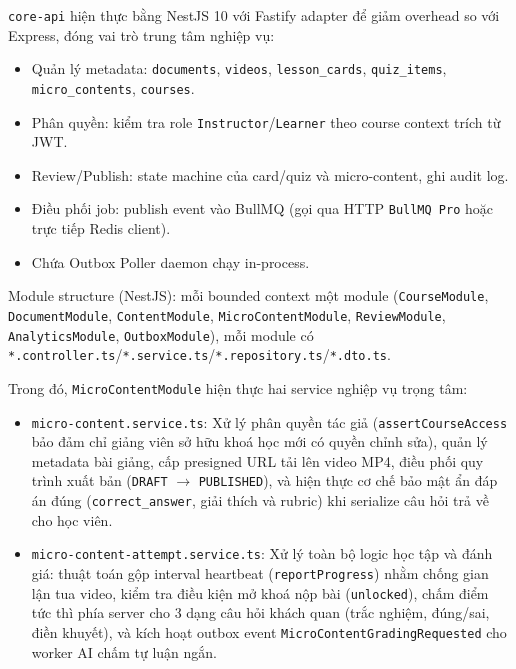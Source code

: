 \texttt{core-api} hiện thực bằng NestJS 10 với Fastify adapter để
giảm overhead so với Express, đóng vai trò trung tâm nghiệp vụ:

\begin{itemize}
    \item Quản lý metadata: \texttt{documents}, \texttt{videos},
          \texttt{lesson\_cards}, \texttt{quiz\_items}, \texttt{micro\_contents}, \texttt{courses}.
    \item Phân quyền: kiểm tra role \texttt{Instructor}/\texttt{Learner}
          theo course context trích từ JWT.
    \item Review/Publish: state machine của card/quiz và micro-content, ghi audit log.
    \item Điều phối job: publish event vào BullMQ (gọi qua HTTP
          \texttt{BullMQ Pro} hoặc trực tiếp Redis client).
    \item Chứa Outbox Poller daemon chạy in-process.
\end{itemize}

Module structure (NestJS): mỗi bounded context một module
(\texttt{CourseModule}, \texttt{DocumentModule}, \texttt{ContentModule},
\texttt{MicroContentModule}, \texttt{ReviewModule}, \texttt{AnalyticsModule}, \texttt{OutboxModule}),
mỗi module có
\texttt{*.controller.ts}/\texttt{*.service.ts}/\texttt{*.repository.ts}/\texttt{*.dto.ts}.

Trong đó, \texttt{MicroContentModule} hiện thực hai service nghiệp vụ trọng tâm:
\begin{itemize}
    \item \texttt{micro-content.service.ts}: Xử lý phân quyền tác giả (\texttt{assertCourseAccess} bảo đảm chỉ giảng viên sở hữu khoá học mới có quyền chỉnh sửa), quản lý metadata bài giảng, cấp presigned URL tải lên video MP4, điều phối quy trình xuất bản (\texttt{DRAFT} $\to$ \texttt{PUBLISHED}), và hiện thực cơ chế bảo mật ẩn đáp án đúng (\texttt{correct\_answer}, giải thích và rubric) khi serialize câu hỏi trả về cho học viên.
    \item \texttt{micro-content-attempt.service.ts}: Xử lý toàn bộ logic học tập và đánh giá: thuật toán gộp interval heartbeat (\texttt{reportProgress}) nhằm chống gian lận tua video, kiểm tra điều kiện mở khoá nộp bài (\texttt{unlocked}), chấm điểm tức thì phía server cho 3 dạng câu hỏi khách quan (trắc nghiệm, đúng/sai, điền khuyết), và kích hoạt outbox event \texttt{MicroContentGradingRequested} cho worker AI chấm tự luận ngắn.
\end{itemize}

